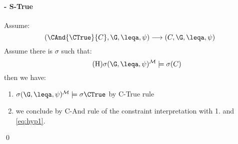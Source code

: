 \paragraph{- \sc S-True}
Assume:
$$(\CAnd{\CTrue}{C},\G,\leqa,\psi) \longrightarrow ({C}, \G, \leqa, \psi) $$
Assume there is $\sigma$ such that:
\begin{equation}\tag{H}
  \label{eq:hyp1}
\sigma(\G,\leqa,\psi)\tomod\models \sigma({C})
\end{equation}
then we have:  
\begin{enumerate}
 \item $\sigma(\G,\leqa,\psi)\tomod\models \sigma\CTrue$ by {\sf C-True} rule 
 \item we conclude by {\sc C-And} rule of the constraint interpretation with 1. and \ref{eq:hyp1}.
\end{enumerate}
\qed


